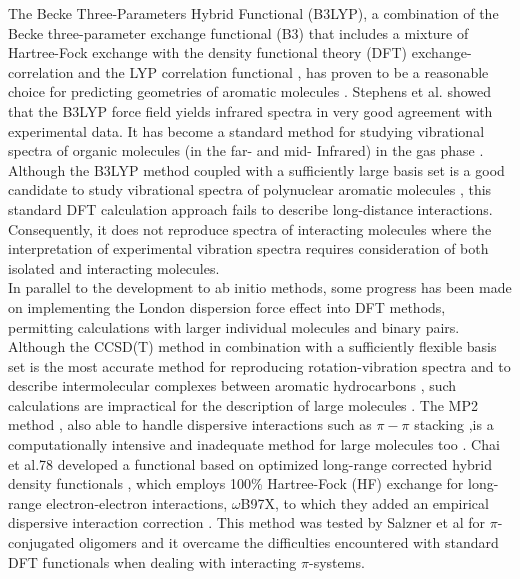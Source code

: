 The Becke Three-Parameters Hybrid Functional (B3LYP), a combination of the Becke three-parameter exchange functional (B3) \cite{becke1993density} that includes a mixture of Hartree-Fock exchange with the density functional theory (DFT) exchange-correlation and the LYP correlation functional \cite{lee1988development}, has proven to be a reasonable choice for predicting geometries of aromatic molecules \cite{bauschlicher1995comparison,tirado2008performance}.  Stephens et al. \cite{stephens1994ab} showed that the B3LYP force field yields infrared spectra in very good agreement with experimental data. It has become a standard method for studying vibrational spectra of organic molecules (in the far- and mid- Infrared) in the gas phase \cite{bauschlicher1997calculation,gohaud2005vibrational}. Although the B3LYP method coupled with a sufficiently large basis set is a good candidate to study vibrational spectra of polynuclear aromatic molecules \cite{michaelian2012far}, this standard DFT calculation approach fails to describe long-distance interactions. Consequently, it does not reproduce spectra of interacting molecules \cite{becke1993density,stephens1994ab,kristyan1994can,hobza1995density} where the interpretation of experimental vibration spectra requires consideration of both isolated and interacting molecules.\\

 In parallel to the development to ab initio methods, some progress has been made on implementing the London dispersion force effect into DFT methods, permitting calculations with larger individual molecules and binary pairs. Although the CCSD(T) method in combination with a sufficiently flexible basis set is the most accurate method for reproducing rotation-vibration spectra and to describe intermolecular complexes between aromatic hydrocarbons \cite{begue2006new}, such calculations are impractical for the description of large molecules \cite{begue2012nitrile}. The MP2 method \cite{pople1979derivative}, also able to handle dispersive interactions such as $\pi-\pi$ stacking \cite{chalasinski2000state,johnson2006structure},is a computationally intensive and inadequate method for large molecules too \cite{eilmes2012theoretical}. Chai et al.78  developed a functional based on optimized long-range corrected hybrid density functionals \cite{chai2008systematic}, which employs 100\% Hartree-Fock (HF) exchange for long-range electron-electron interactions, $\omega$B97X, to which they added an empirical dispersive interaction correction \cite{eilmes2012theoretical}. This method was tested by Salzner et al \cite{salzner2011improved} for $\pi$-conjugated oligomers and it overcame the difficulties encountered with standard DFT functionals when dealing with interacting $\pi$-systems.\\
 

